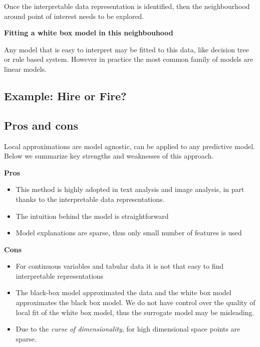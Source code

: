 \documentclass[]{krantz}
\providecommand{\tightlist}{%
  \setlength{\itemsep}{0pt}\setlength{\parskip}{0pt}}
\theoremstyle{definition}
\theoremstyle{definition}
\theoremstyle{definition}
\theoremstyle{remark}
\begin{document}
Once the interpretable data representation is identified, then the
neighbourhood around point of interest needs to be explored.

\textbf{Fitting a white box model in this neighbouhood}

Any model that is easy to interpret may be fitted to this data, like
decision tree or rule based system. However in practice the most common
family of models are linear models.

\hypertarget{example-hire-or-fire-3}{%
\subsection{Example: Hire or Fire?}\label{example-hire-or-fire-3}}

\hypertarget{pros-and-cons-5}{%
\subsection{Pros and cons}\label{pros-and-cons-5}}

Local approximations are model agnostic, can be applied to any
predictive model. Below we summarize key strengths and weaknesses of
this approach.

\textbf{Pros}

\begin{itemize}
\tightlist
\item
  This method is highly adopted in text analysis and image analysis, in
  part thanks to the interpretable data representations.
\item
  The intuition behind the model is straightforward
\item
  Model explanations are sparse, thus only small number of features is
  used
\end{itemize}

\textbf{Cons}

\begin{itemize}
\tightlist
\item
  For continuous variables and tabular data it is not that easy to find
  interpretable representations
\item
  The black-box model approximated the data and the white box model
  approximates the black box model. We do not have control over the
  quality of local fit of the white box model, thus the surrogate model
  may be misleading.
\item
  Due to the \emph{curse of dimensionality}, for high dimensional space
  points are sparse.
\end{itemize}
\end{document}
